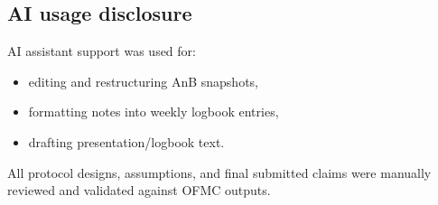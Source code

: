 \documentclass[11pt,a4paper]{article}
\begin{document}
\subsection*{AI usage disclosure}
AI assistant support was used for:
\begin{itemize}[leftmargin=1.2em]
  \item editing and restructuring AnB snapshots,
  \item formatting notes into weekly logbook entries,
  \item drafting presentation/logbook text.
\end{itemize}
All protocol designs, assumptions, and final submitted claims were manually reviewed and validated against OFMC outputs.
\end{document}
